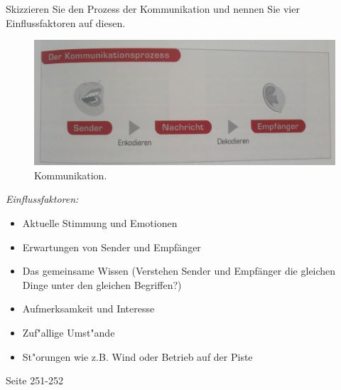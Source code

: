 \begin{question}{4}
Skizzieren Sie den Prozess der Kommunikation und nennen Sie vier Einflussfaktoren auf diesen.
\end{question}
\begin{solution}
\begin{figure}[H]
  \centering
  \includegraphics[width=12cm]{pic/kommunikation.jpg}
  \caption{Kommunikation.}
  \label{fig:kommunikation}
\end{figure}
\emph{Einflussfaktoren:}
\begin{itemize}
\item Aktuelle Stimmung und Emotionen
\item Erwartungen von Sender und Empfänger
\item Das gemeinsame Wissen (Verstehen Sender und Empfänger die gleichen Dinge unter den gleichen Begriffen?)
\item Aufmerksamkeit und Interesse
\item Zuf"allige Umst"ande
\item St"orungen wie z.B. Wind oder Betrieb auf der Piste
\end{itemize}
 Seite 251-252
\end{solution}

